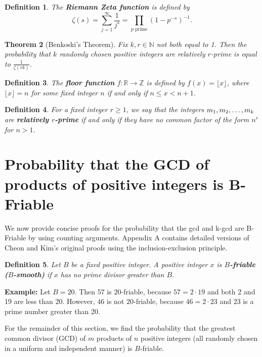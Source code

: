 \documentclass[12pt]{amsart}
\newtheorem{theorem}{Theorem}[subsection]
\newtheorem{definition}[theorem]{Definition}
\theoremstyle{definition}
\begin{document}
\begin{definition} \label{riemann-zeta}
	The \textbf{Riemann Zeta function} is defined by 
	$$\zeta(s)=\sum_{j=1}^{\infty} \frac{1}{j^s}=\prod_{p \textrm{ prime}}(1-p^{-s})^{-1}.$$
\end{definition}	

\begin{theorem}[Benkoski's Theorem]
Fix $k,r\in \mathbb{N}$ not both equal to 1. Then the probability that $k$ randomly chosen positive integers are relatively $r$-prime is equal to $\displaystyle \frac{1}{\zeta(rk)}$.
\end{theorem}


\begin{definition} The \textbf{floor function} $f: \mathbb{R} \to \mathbb{Z}$ is defined by $f(x) = \lfloor x \rfloor$, where $\lfloor x \rfloor = n$ for some fixed integer $n$ if and only if $n\leq x < n+1$.
\end{definition}

\begin{definition} For a fixed integer \(r\geq 1\), we say that the integers \(m_1,m_2,\mathellipsis,m_k\) are \textbf{relatively \(r\)-prime} if and only if they have no common factor of the form \(n^r\) for \(n>1\). 
\end{definition}

 \section{Probability that the GCD of products of positive integers is  B-Friable}
We now provide concise proofs for the probability that the gcd and k-gcd are B-Friable by using counting arguments. Appendix A contains detailed versions of Cheon and Kim's original proofs using the inclusion-exclusion principle. %

\begin{definition} Let $B$ be a fixed positive integer. A positive integer $x$ is \textbf{$B$-friable ($B$-smooth)} if $x$ has no prime divisor greater than $B$. 
\end{definition}

\noindent \textbf{Example:} Let $B = 20$. Then $57$ is $20$-friable, because $57 = 2 \cdot 19$ and both 2 and 19 are less than 20. However, $46$ is not $20$-friable, because $46= 2 \cdot 23$ and 23 is a prime number greater than 20.

\vspace{.1 in}

For the remainder of this section, we find the probability that the greatest common divisor (GCD) of $m$ products of $n$ positive integers (all randomly chosen in a uniform and independent manner) is $B$-friable.
\end{document}

